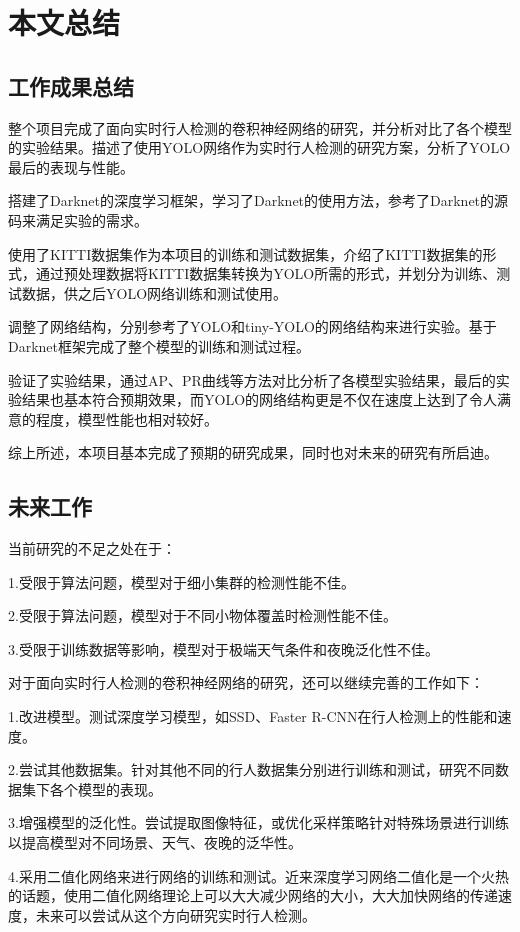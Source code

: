 \chapter{本文总结}

\section{工作成果总结}{
	整个项目完成了面向实时行人检测的卷积神经网络的研究，并分析对比了各个模型的实验结果。描述了使用YOLO网络作为实时行人检测的研究方案，分析了YOLO最后的表现与性能。

	搭建了Darknet的深度学习框架，学习了Darknet的使用方法，参考了Darknet的源码来满足实验的需求。

	使用了KITTI数据集作为本项目的训练和测试数据集，介绍了KITTI数据集的形式，通过预处理数据将KITTI数据集转换为YOLO所需的形式，并划分为训练、测试数据，供之后YOLO网络训练和测试使用。

	调整了网络结构，分别参考了YOLO和tiny-YOLO的网络结构来进行实验。基于Darknet框架完成了整个模型的训练和测试过程。

	验证了实验结果，通过AP、PR曲线等方法对比分析了各模型实验结果，最后的实验结果也基本符合预期效果，而YOLO的网络结构更是不仅在速度上达到了令人满意的程度，模型性能也相对较好。

	综上所述，本项目基本完成了预期的研究成果，同时也对未来的研究有所启迪。
}

\section{未来工作}{
	当前研究的不足之处在于：

	1.受限于算法问题，模型对于细小集群的检测性能不佳。

	2.受限于算法问题，模型对于不同小物体覆盖时检测性能不佳。

	3.受限于训练数据等影响，模型对于极端天气条件和夜晚泛化性不佳。

	对于面向实时行人检测的卷积神经网络的研究，还可以继续完善的工作如下：

	1.改进模型。测试深度学习模型，如SSD、Faster R-CNN在行人检测上的性能和速度。

	2.尝试其他数据集。针对其他不同的行人数据集分别进行训练和测试，研究不同数据集下各个模型的表现。

	3.增强模型的泛化性。尝试提取图像特征，或优化采样策略针对特殊场景进行训练以提高模型对不同场景、天气、夜晚的泛华性。

	4.采用二值化网络来进行网络的训练和测试\cite{}。近来深度学习网络二值化是一个火热的话题，使用二值化网络理论上可以大大减少网络的大小，大大加快网络的传递速度，未来可以尝试从这个方向研究实时行人检测。
}

